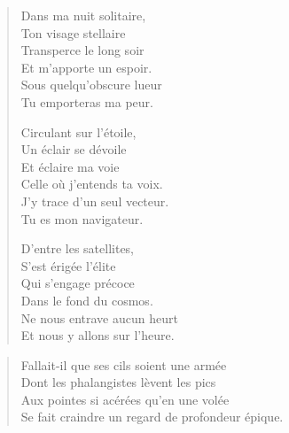 \begin{verse}\sizain
  Dans ma nuit solitaire,\\ 
  Ton visage stellaire\\ 
  Transperce le long soir\\ 
  Et m’apporte un espoir.\\ 
  Sous quelqu’obscure lueur\\ 
  Tu emporteras ma peur.  %

  Circulant sur l’étoile,\\ 
  Un éclair se dévoile\\ 
  Et éclaire ma voie\\ 
  Celle où j’entends ta voix.\\ 
  J’y trace d’un seul vecteur.\\ 
  Tu es mon navigateur.  %

  D’entre les satellites,\\ 
  S’est érigée l’élite\\ 
  Qui s’engage précoce\\ 
  Dans le fond du cosmos.\\ 
  Ne nous entrave aucun heurt\\ 
  Et nous y allons sur l’heure.  %
\end{verse}

\begin{verse}\quatrain
  Fallait-il que ses cils soient une armée\\ 
  Dont les phalangistes lèvent les pics\\ 
  Aux pointes si acérées qu’en une volée\\ 
  Se fait craindre un regard de profondeur épique.\\ 
\end{verse}

